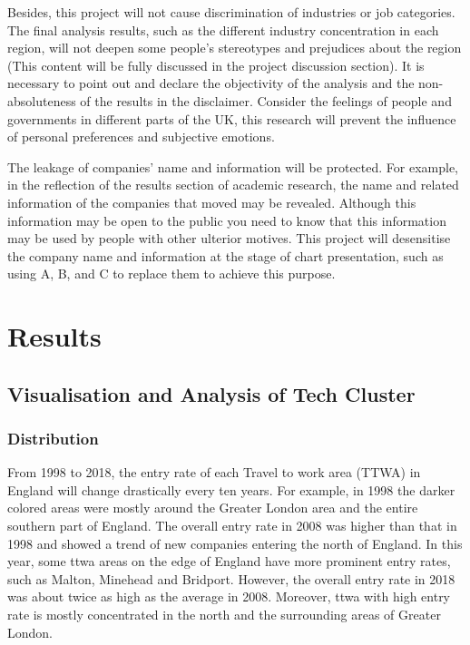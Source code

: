 \documentclass[
  12pt,
  oneside]{book}
\begin{document}
Besides, this project will not cause discrimination of industries or job categories. The final analysis results, such as the different industry concentration in each region, will not deepen some people's stereotypes and prejudices about the region (This content will be fully discussed in the project discussion section). It is necessary to point out and declare the objectivity of the analysis and the non-absoluteness of the results in the disclaimer. Consider the feelings of people and governments in different parts of the UK, this research will prevent the influence of personal preferences and subjective emotions.

The leakage of companies' name and information will be protected. For example, in the reflection of the results section of academic research, the name and related information of the companies that moved may be revealed. Although this information may be open to the public you need to know that this information may be used by people with other ulterior motives. This project will desensitise the company name and information at the stage of chart presentation, such as using A, B, and C to replace them to achieve this purpose.

\hypertarget{results}{%
\chapter{Results}\label{results}}

\hypertarget{visualisation-and-analysis-of-tech-cluster}{%
\section{Visualisation and Analysis of Tech Cluster}\label{visualisation-and-analysis-of-tech-cluster}}

\hypertarget{distribution}{%
\subsection{Distribution}\label{distribution}}

From 1998 to 2018, the entry rate of each Travel to work area (TTWA) in England will change drastically every ten years. For example, in 1998 the darker colored areas were mostly around the Greater London area and the entire southern part of England. The overall entry rate in 2008 was higher than that in 1998 and showed a trend of new companies entering the north of England. In this year, some ttwa areas on the edge of England have more prominent entry rates, such as Malton, Minehead and Bridport. However, the overall entry rate in 2018 was about twice as high as the average in 2008. Moreover, ttwa with high entry rate is mostly concentrated in the north and the surrounding areas of Greater London.
\end{document}
